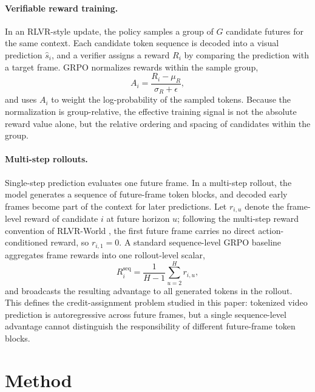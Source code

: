 \documentclass[letterpaper]{article} %
\begin{document}
\paragraph{Verifiable reward training.}
In an RLVR-style update, the policy samples a group of $G$ candidate futures for the same context. Each candidate token sequence is decoded into a visual prediction $\hat{s}_i$, and a verifier assigns a reward $R_i$ by comparing the prediction with a target frame. GRPO normalizes rewards within the sample group,
\begin{equation}
A_i=\frac{R_i-\mu_R}{\sigma_R+\epsilon},
\label{eq:groupnorm}
\end{equation}
and uses $A_i$ to weight the log-probability of the sampled tokens. Because the normalization is group-relative, the effective training signal is not the absolute reward value alone, but the relative ordering and spacing of candidates within the group.

\paragraph{Multi-step rollouts.}
Single-step prediction evaluates one future frame. In a multi-step rollout, the model generates a sequence of future-frame token blocks, and decoded early frames become part of the context for later predictions. Let $r_{i,u}$ denote the frame-level reward of candidate $i$ at future horizon $u$; following the multi-step reward convention of RLVR-World \citep{rlvrworld}, the first future frame carries no direct action-conditioned reward, so $r_{i,1}=0$. A standard sequence-level GRPO baseline aggregates frame rewards into one rollout-level scalar,
\begin{equation}
R_i^{\mathrm{seq}}=\frac{1}{H-1}\sum_{u=2}^{H}r_{i,u},
\label{eq:seqreward}
\end{equation}
and broadcasts the resulting advantage to all generated tokens in the rollout. This defines the credit-assignment problem studied in this paper: tokenized video prediction is autoregressive across future frames, but a single sequence-level advantage cannot distinguish the responsibility of different future-frame token blocks.

\section{Method}
\end{document}
